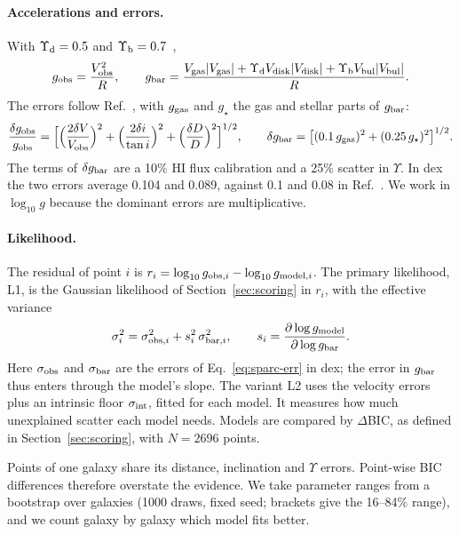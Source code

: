 \paragraph{Accelerations and errors.} With $\Upsilon_{\rm d}=0.5$ and $\Upsilon_{\rm b}=0.7$~\cite{mcgaugh2016},
\begin{equation}\label{eq:sparc-g}
g_{\rm obs}=\frac{V_{\rm obs}^2}{R},\qquad
g_{\rm bar}=\frac{V_{\rm gas}|V_{\rm gas}|+\Upsilon_{\rm d}V_{\rm disk}|V_{\rm disk}|+\Upsilon_{\rm b}V_{\rm bul}|V_{\rm bul}|}{R}.
\end{equation}
The errors follow Ref.~\cite[Eq.~(2), Sect.~2.1.2]{lelli2017}, with $g_{\rm gas}$ and $g_\star$ the gas and stellar parts of
$g_{\rm bar}$:
\begin{equation}\label{eq:sparc-err}
\frac{\delta g_{\rm obs}}{g_{\rm obs}}=\Big[\Big(\frac{2\delta V}{V_{\rm obs}}\Big)^2+\Big(\frac{2\delta i}{\tan i}\Big)^2
+\Big(\frac{\delta D}{D}\Big)^2\Big]^{1/2},\qquad \delta g_{\rm bar}=\big[(0.1\,g_{\rm gas})^2+(0.25\,g_\star)^2\big]^{1/2}.
\end{equation}
The terms of $\delta g_{\rm bar}$ are a 10\% HI flux calibration and a 25\% scatter in $\Upsilon$. In dex the two errors average 0.104
and 0.089, against 0.1 and 0.08 in Ref.~\cite{lelli2017}. We work in $\log_{10}g$ because the dominant errors are multiplicative.

\paragraph{Likelihood.} The residual of point $i$ is $r_i=\log_{10}g_{{\rm obs},i}-\log_{10}g_{{\rm model},i}$. The primary likelihood,
L1, is the Gaussian likelihood of Section~\ref{sec:scoring} in $r_i$, with the effective variance
\begin{equation}\label{eq:sparc-like}
\sigma_i^2=\sigma_{{\rm obs},i}^2+s_i^2\,\sigma_{{\rm bar},i}^2,\qquad s_i=\frac{\partial\log g_{\rm model}}{\partial\log g_{\rm bar}} .
\end{equation}
Here $\sigma_{\rm obs}$ and $\sigma_{\rm bar}$ are the errors of Eq.~\eqref{eq:sparc-err} in dex; the error in $g_{\rm bar}$ thus enters
through the model's slope. The variant L2 uses the velocity errors plus an intrinsic floor $\sigma_{\rm int}$, fitted for each model. It
measures how much unexplained scatter each model needs. Models are compared by $\Delta$BIC, as defined in Section~\ref{sec:scoring}, with
$N=2696$ points.

Points of one galaxy share its distance, inclination and $\Upsilon$ errors. Point-wise BIC differences therefore overstate the evidence.
We take parameter ranges from a bootstrap over galaxies (1000 draws, fixed seed; brackets give the 16--84\% range), and we count galaxy by
galaxy which model fits better.

